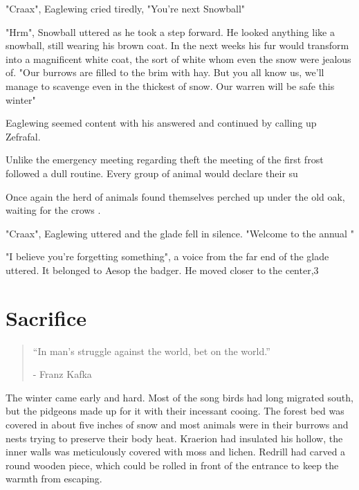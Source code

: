 \documentclass[smalldemyvopaper,11pt,twoside,onecolumn,openright,extrafontsizes]{memoir}
\begin{document}
"Craax", Eaglewing cried tiredly, "You're next Snowball"

"Hrm", Snowball uttered as he took a step forward. He looked anything like a snowball, still wearing his brown coat. In the next weeks his fur would transform into a magnificent white coat, the sort of white whom even the snow were jealous of. "Our burrows are filled to the brim with hay. But you all know us, we'll manage to scavenge even in the thickest of snow. Our warren will be safe this winter"

Eaglewing seemed content with his answered and continued by calling up Zefrafal. 

Unlike the emergency meeting regarding theft the meeting of the first frost followed a dull routine. Every group of animal would declare their su
 
 
Once again the herd of animals found themselves perched up under the old oak, waiting for the crows . 

"Craax", Eaglewing uttered and the glade fell in silence. "Welcome to the annual "


"I believe you're forgetting something", a voice from the far end of the glade uttered. It belonged to Aesop the badger. He moved closer to the center,3  

\chapter{Sacrifice}

\vspace{-1.3cm}
\begin{localsize}{10}
	\begin{quote}
		“In man's struggle against the world, bet on the world.”
		\begin{flushright}- Franz Kafka \end{flushright}
	\end{quote} 
\end{localsize}
\vspace{1cm}

The winter came early and hard. Most of the song birds had long migrated south, but the pidgeons made up for it with their incessant cooing. The forest bed was covered in about five inches of snow and most animals were in their burrows and nests trying to preserve their body heat. Kraerion had insulated his hollow, the inner walls was meticulously covered with moss and lichen. Redrill had carved a round wooden piece, which could be rolled in front of the entrance to keep the warmth from escaping.  
\end{document}
